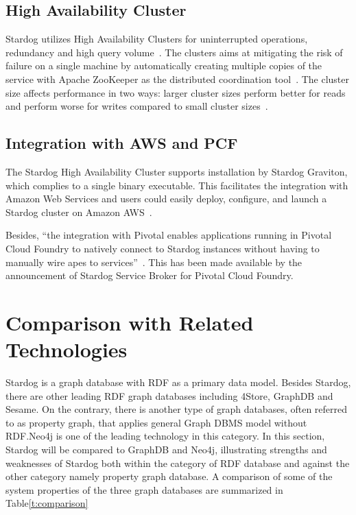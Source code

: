 \subsection{High Availability Cluster}
Stardog utilizes High Availability Clusters for uninterrupted operations, 
redundancy and high query volume~\cite{hid-sp18-405-www-stardog-docs}. 
The clusters aims at mitigating the risk of failure on a single machine by 
automatically creating multiple copies of the service with Apache ZooKeeper 
as the distributed coordination 
tool~\cite{hid-sp18-405-www-stardog-predictiveanalyticstoday}. The cluster 
size affects performance in two ways: larger cluster sizes perform better 
for reads and perform worse for writes compared to small cluster 
sizes~\cite{hid-sp18-405-www-stardog-docs}. 

\subsection{Integration with AWS and PCF}
The Stardog High Availability Cluster supports installation by Stardog 
Graviton, which complies to a single binary executable. This facilitates the 
integration with Amazon Web Services and users could easily deploy, 
configure, and launch a Stardog cluster on Amazon 
AWS~\cite{hid-sp18-405-blog-stardog-aws}. 

Besides, ``the integration with Pivotal enables applications running in Pivotal 
Cloud Foundry to natively connect to Stardog instances without having to 
manually wire apes to services''~\cite{hid-sp18-405-blog-stardog-pcf}. This 
has been made available by the announcement of Stardog Service Broker for 
Pivotal Cloud Foundry.

\section{Comparison with Related Technologies}
Stardog is a graph database with RDF as a primary data model. Besides 
Stardog, there are other leading RDF graph databases including 4Store, 
GraphDB and Sesame. On the contrary, there is another type of graph 
databases, often referred to as property graph, that applies general Graph 
DBMS model without RDF.\@ Neo4j is one of the leading technology in this 
category. In this section, Stardog will be compared to GraphDB and Neo4j, 
illustrating strengths and weaknesses of Stardog both within the category of 
RDF database and against the other category namely property graph 
database. A comparison of some of the system properties of the three graph 
databases are summarized in 
Table\ref{t:comparison}~\cite{hid-sp18-405-www-stardog-dbengines-neo4j}~\cite{hid-sp18-405-www-stardog-dbengines-graphdb}

